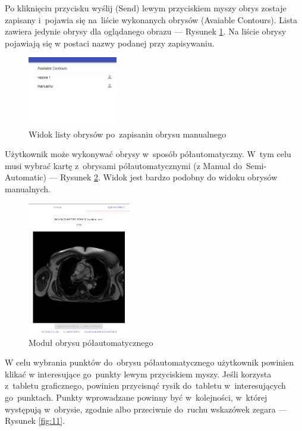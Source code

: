\documentclass[a4paper,11pt,twoside,openright]{report}
\theoremstyle{definition}
\begin{document}
Po kliknięciu przycisku wyślij (Send) lewym przyciskiem myszy obrys zostaje
zapisany i~pojawia się na~liście wykonanych obrysów (Avaiable Contours). Lista
zawiera jedynie obrysy dla oglądanego obrazu --- Rysunek \ref{fig:9}. Na liście
obrysy pojawiają się w postaci nazwy podanej przy zapisywaniu.

\begin{figure}[h!]
	\center
	\includegraphics[width=0.35\textwidth]{9}
	\caption{Widok listy obrysów po~zapisaniu obrysu manualnego}
    	\label{fig:9}
\end{figure}

Użytkownik może wykonywać obrysy w~sposób półautomatyczny. W~tym celu musi
wybrać kartę z~obrysami półautomatycznymi (z Manual do~Semi-Automatic) ---
Rysunek \ref{fig:10}. Widok jest bardzo podobny do widoku obrysów manualnych.

\pagebreak

\begin{figure}[h!]
	\center
	\includegraphics[width=0.4\textwidth]{10}
	\caption{Moduł obrysu półautomatycznego}
    	\label{fig:10}
\end{figure}

W celu wybrania punktów do~obrysu półautomatycznego użytkownik powinien klikać w
interesujące go~punkty lewym przyciskiem myszy. Jeśli korzysta z~tabletu
graficznego, powinien przycisnąć rysik do~tabletu w~interesujących go~punktach.
Punkty wprowadzane powinny być w~kolejności, w~której występują w~obrysie,
zgodnie albo przeciwnie do~ruchu wskazówek zegara --- Rysunek \ref{fig:11}.
\end{document}
